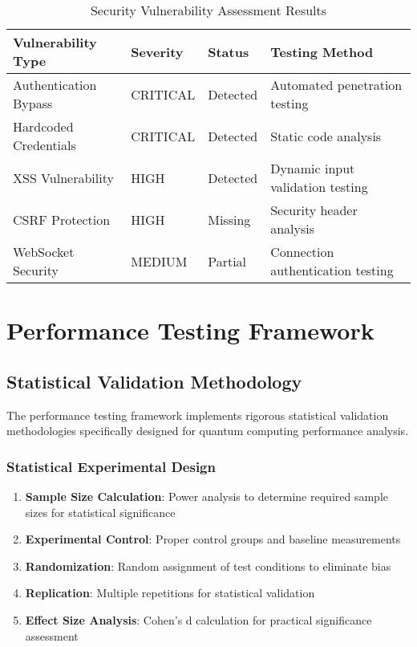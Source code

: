 \documentclass[12pt,a4paper]{report}
\begin{document}
\begin{table}[H]
\centering
\caption{Security Vulnerability Assessment Results}
\begin{tabular}{@{}p{3cm}p{2cm}p{2cm}p{5cm}@{}}
\toprule
Vulnerability Type & Severity & Status & Testing Method \\
\midrule
Authentication Bypass & CRITICAL & Detected & Automated penetration testing \\
Hardcoded Credentials & CRITICAL & Detected & Static code analysis \\
XSS Vulnerability & HIGH & Detected & Dynamic input validation testing \\
CSRF Protection & HIGH & Missing & Security header analysis \\
WebSocket Security & MEDIUM & Partial & Connection authentication testing \\
\bottomrule
\end{tabular}
\end{table}

\section{Performance Testing Framework}

\subsection{Statistical Validation Methodology}

The performance testing framework implements rigorous statistical validation methodologies specifically designed for quantum computing performance analysis.

\subsubsection{Statistical Experimental Design}

\begin{enumerate}
\item \textbf{Sample Size Calculation}: Power analysis to determine required sample sizes for statistical significance
\item \textbf{Experimental Control}: Proper control groups and baseline measurements
\item \textbf{Randomization}: Random assignment of test conditions to eliminate bias
\item \textbf{Replication}: Multiple repetitions for statistical validation
\item \textbf{Effect Size Analysis}: Cohen's d calculation for practical significance assessment
\end{enumerate}
\end{document}
